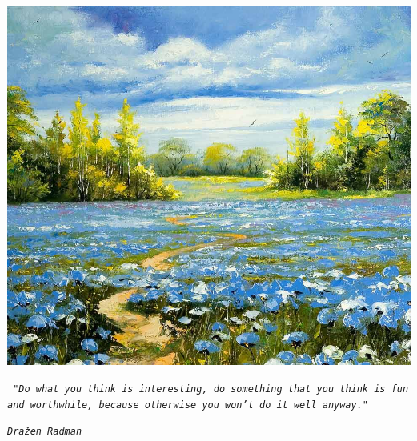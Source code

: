 \documentclass[a4paper,twoside, svgnames]{article}
\begin{document}
\begin{minipage}[b]{0.5\linewidth}

\end{minipage}
\newpage
\begin{center}
\includegraphics[width=\linewidth]{images/nature}
\end{center}

\vspace*{1mm}
\begin{center}

	\Large{\parbox{\linewidth}{
		\begin{center}
		{\Large
		\texttt{
			\textit{"Do what you think is interesting, 
			do something that you think is fun and worthwhile, 
			because otherwise you won’t do it well anyway."}
			}
		}
		\end{center}
		\begin{center}
		{\Large
			\textit{\texttt{\textemdash Dražen Radman}}
		}
		\end{center}
	}
}
\end{center}
\newpage

\begin{minipage}[b]{0.5\linewidth}

\end{minipage}
\end{document}
